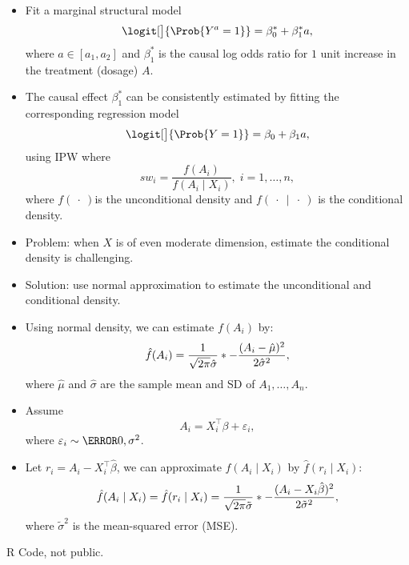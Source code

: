 \documentclass[oneside]{book}\usepackage[]{graphicx}\usepackage[svgnames]{xcolor}
\let\exp\relax%
\begin{document}
\begin{itemize}
      \item Fit a marginal structural model
            \[ \logit[\big]{\Prob{Y^a=1}}=\beta_0^*+\beta_1^*a, \]
            where $ a\in[a_1,a_2] $ and $ \beta_1^* $ is the causal log odds ratio for $1$
            unit increase in the treatment (dosage) $A$.
      \item The causal effect $ \beta_1^* $ can be consistently estimated by fitting
            the corresponding regression model
            \[ \logit[\big]{\Prob{Y=1}}=\beta_0+\beta_1a, \]
            using IPW where
            \[ sw_i=\frac{f(A_i)}{f(A_i\mid X_i)},\; i=1,\ldots,n, \]
            where $f(\:\cdot\:)$is the unconditional density and  $f(\:\cdot\:\mid\:\cdot\:)$ is the
            conditional density.
      \item Problem: when $X$ is of even moderate dimension, estimate the
            conditional density is challenging.
      \item Solution: use normal approximation to estimate the
            unconditional and conditional density.
      \item Using normal density, we can estimate $f (A_i )$ by:
            \[ \hat{f}(A_i)=\frac{1}{\sqrt{2\pi}\hat{\sigma}}\exp*{-\frac{(A_i-\hat{\mu})^2}{2\hat{\sigma}^2}}, \]
            where $ \hat{\mu} $ and $ \hat{\sigma} $ are the sample mean and SD of $ A_1,\ldots,A_n $.
      \item Assume
            \[ A_i=X_i^\top \beta+\varepsilon_i, \]
            where $ \varepsilon_i \sim \N{0,\sigma^2} $.
      \item Let $ r_i=A_i-X_i^\top \hat{\beta} $, we can approximate $ f(A_i\mid X_i) $ by $ \hat{f}(r_i\mid X_i) $:
            \[ \hat{f}(A_i\mid X_i)=\hat{f}(r_i\mid X_i)=\frac{1}{\sqrt{2\pi}\tilde{\sigma}}\exp*{-\frac{(A_i-X_i\hat{\beta})^2}{2\tilde{\sigma}^2}}, \]
            where $ \tilde{\sigma}^2 $ is the mean-squared error (MSE).
\end{itemize}
R Code, not public.
\end{document}
